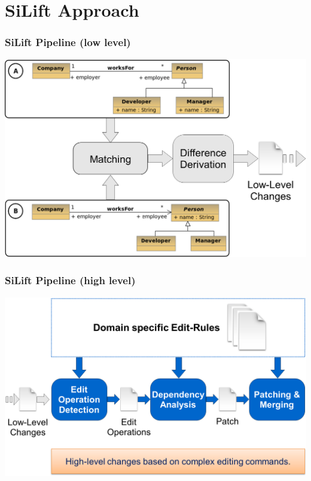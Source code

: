 \section{SiLift Approach}

\begin{frame}
  \frametitle{SiLift Pipeline (low level)}
  \begin{center}
  \includegraphics[scale=0.45]{images/pipeline_low-level}
  \end{center}
\end{frame}

\begin{frame}
  \frametitle{SiLift Pipeline (high level)}
  \begin{center}
  \includegraphics[scale=0.45]{images/pipeline_high-level}
  \end{center}
\end{frame}

